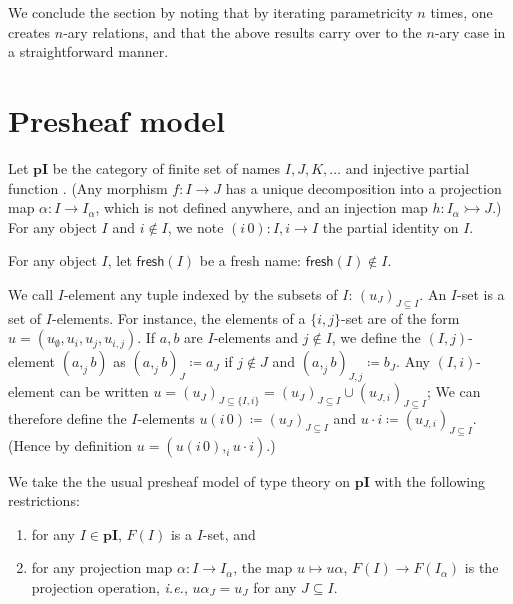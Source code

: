 \documentclass[english]{PaperTools/latex/lipics}
\def\pI{\ensuremath{\mathbf{pI}}}
\def\fresh#1{\mathsf{fresh}(#1)}
\def\ie{\textit{i.e.}}
\begin{document}
We conclude the section by noting that by iterating parametricity $n$
times, one creates $n$-ary relations, and that the above results carry
over to the $n$-ary case in a straightforward manner.
\section{Presheaf model}

\begin{definition}
  Let \pI{} be the category of finite set of names $I,J,K,…$ and injective
  partial function \cite[ex.~9.7 p.~176]{PittsAM:nomsns}.
  (Any morphism $f : I → J$ has a unique decomposition into a projection map
  $α : I → I_α$, which is not defined anywhere, and an injection map $h : I_α ↣ J$.)
  For any object $I$ and $i ∉ I$, we note $(i \, 0) : I,i → I$ the partial
  identity on $I$.


  For any object $I$, let $\fresh{I}$ be a fresh name: $\fresh{I} ∉ I$.
\end{definition}

\begin{definition}
  We call $I$-element any tuple indexed by the subsets of $I$: $(u_J)_{J ⊆ I}$.
  An $I$-set is a set of $I$-elements.  For instance, the elements of a
  $\{i,j\}$-set are of the form $u = (u_∅,u_i,u_j,u_{i,j})$.
  If $a,b$ are $I$-elements and $j ∉ I$, we define the $(I,j)$-element
  $(a ,_j b)$ as $(a ,_j b)_J ≔ a_J$ if $j ∉ J$ and $(a ,_j b)_{J,j} ≔ b_J$.
  Any $(I,i)$-element can be written $u = (u_J)_{J ⊆ \{I,i\}} = (u_J)_{J ⊆ I} ∪ (u_{J,i})_{J ⊆ I}$;
  We can therefore define the $I$-elements $u (i\,0) ≔ (u_J)_{J ⊆ I}$ and $u · i ≔ (u_{J,i})_{J ⊆ I}$.
  (Hence by definition $u = (u (i\,0) ,_i u · i)$.)
\end{definition}

\bigskip
We take the the usual presheaf model of type theory on \pI{} with the
following restrictions:
\begin{enumerate}
  \item for any $I ∈ \pI$, $F(I)$ is a $I$-set, and
  \item for any projection map $α : I → I_α$, the
    map $u ↦ uα$, $F(I) → F(I_α)$ is the projection operation, \ie,
    $uα_J = u_J$ for any $J ⊆ I$.
\end{enumerate}
\end{document}
